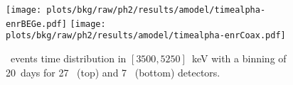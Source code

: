 \begin{figure}
  \centering
  \texttt{[image: plots/bkg/raw/ph2/results/amodel/timealpha-enrBEGe.pdf]}
  \texttt{[image: plots/bkg/raw/ph2/results/amodel/timealpha-enrCoax.pdf]}
  \caption{%
    \a\ events time distribution in $[3500,5250]$~keV with a binning of 20~days for 27
    \bege\ (top) and 7 \scoax\ (bottom) detectors.
  }\label{fig:bkg:raw:timealpha:results}
\end{figure}

\begin{table}
  \centering
  \caption{%
    Results of the \a\ events time distribution analysis in $[3500,5250]$~keV with a
    binning of 20~days for 27 \bege\ and 7 \scoax\ detectors.
  }\label{tab:bkg:raw:timealpha:results}
  
\end{table}

